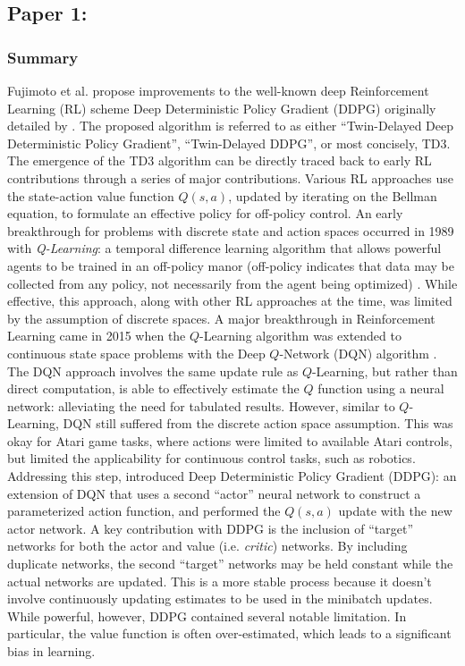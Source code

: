 \documentclass{article}
\begin{document}
\subsection{Paper 1: \citep{td3}}
\subsubsection{Summary}
Fujimoto et al. propose improvements to the well-known deep Reinforcement Learning (RL) scheme Deep Deterministic Policy Gradient (DDPG) originally detailed by \citep{ddpg}. The proposed algorithm is referred to as either ``Twin-Delayed Deep Deterministic Policy Gradient'', ``Twin-Delayed DDPG'', or most concisely, TD3. The emergence of the TD3 algorithm can be directly traced back to early RL contributions through a series of major contributions.  Various RL approaches use the state-action value function $Q(s,a)$,  updated by iterating on the Bellman equation, to formulate an effective policy for off-policy control. An early breakthrough for problems with discrete state and action spaces occurred in 1989 with \textit{Q-Learning}: a temporal difference learning algorithm that allows powerful agents to be trained in an off-policy manor (off-policy indicates that data may be collected from any policy, not necessarily from the agent being optimized) \citep{textbook}. While effective, this approach, along with other RL approaches at the time, was limited by the assumption of discrete spaces. A major breakthrough in Reinforcement Learning came in 2015 when the $Q$-Learning algorithm was extended to continuous state space problems with the Deep $Q$-Network (DQN) algorithm \citep{dqn}. The DQN approach involves the same update rule as $Q$-Learning, but rather than direct computation, is able to effectively estimate the $Q$ function using a neural network: alleviating the need for tabulated results. However, similar to $Q$-Learning, DQN still suffered from the discrete action space assumption. This was okay for Atari game tasks, where actions were limited to available Atari controls, but limited the applicability for continuous control tasks, such as robotics. Addressing this step, \citep{ddpg} introduced Deep Deterministic Policy Gradient (DDPG): an extension of DQN that uses a second ``actor'' neural network to construct a parameterized action function, and performed the $Q(s,a)$ update with the new actor network. A key contribution with DDPG is the inclusion of ``target'' networks for both the actor and value (i.e. \textit{critic}) networks. By including duplicate networks, the second ``target'' networks may be held constant while the actual networks are updated. This is a more stable process because it doesn't involve continuously updating estimates to be used in the minibatch updates. While powerful, however, DDPG contained several notable limitation. In particular, the value function is often over-estimated, which leads to a significant bias in learning.
\end{document}
